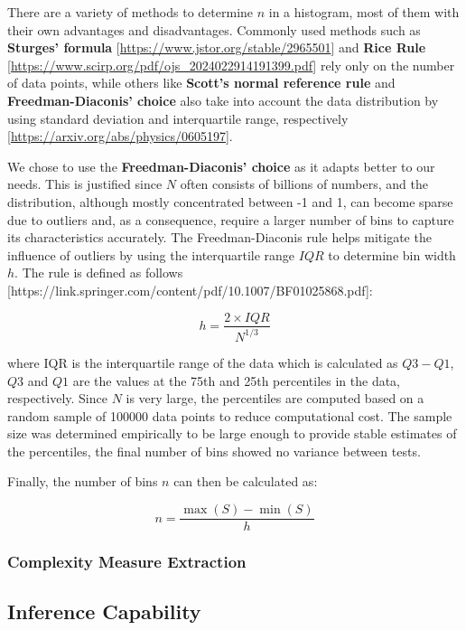         There are a variety of methods to determine \( n \) in a histogram, most of them with their own advantages and disadvantages. Commonly used methods such as \textbf{Sturges' formula} [\url{https://www.jstor.org/stable/2965501}] and \textbf{Rice Rule} [\url{https://www.scirp.org/pdf/ojs_2024022914191399.pdf}] rely only on the number of data points, while others like \textbf{Scott's normal reference rule} and \textbf{Freedman-Diaconis' choice} also take into account the data distribution by using standard deviation and interquartile range, respectively [\url{https://arxiv.org/abs/physics/0605197}].   

        We chose to use the \textbf{Freedman-Diaconis' choice} as it adapts better to our needs. This is justified since \( N \) often consists of billions of numbers, and the distribution, although mostly concentrated between -1 and 1, can become sparse due to outliers and, as a consequence, require a larger number of bins to capture its characteristics accurately. The Freedman-Diaconis rule helps mitigate the influence of outliers by using the interquartile range \( IQR \) to determine bin width \( h \). The rule is defined as follows [https://link.springer.com/content/pdf/10.1007/BF01025868.pdf]:

        \[ h = \frac{2 \times IQR}{N^{1/3}} \]

        where IQR is the interquartile range of the data which is calculated as \( Q3 - Q1 \), \( Q3 \) and \( Q1 \) are the values at the 75th and 25th percentiles in the data, respectively. Since \( N \) is very large, the percentiles are computed based on a random sample of 100000 data points to reduce computational cost. The sample size was determined empirically to be large enough to provide stable estimates of the percentiles, the final number of bins showed no variance between tests.

        Finally, the number of bins \( n \) can then be calculated as:

        \[ n = \frac{\max(S) - \min(S)}{h} \]

    \subsubsection{Complexity Measure Extraction}

\subsection{Inference Capability}

